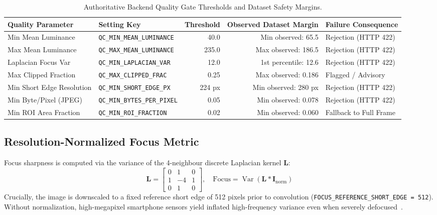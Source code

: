 \documentclass[11pt,a4paper]{report}
\begin{document}
\begin{table}[H]
\centering
\small
\begin{tabularx}{\textwidth}{llrrX}
\toprule
\textbf{Quality Parameter} & \textbf{Setting Key} & \textbf{Threshold} & \textbf{Observed Dataset Margin} & \textbf{Failure Consequence} \\
\midrule
Min Mean Luminance & \texttt{QC\_MIN\_MEAN\_LUMINANCE} & 40.0 & Min observed: 65.5 & Rejection (HTTP 422) \\
Max Mean Luminance & \texttt{QC\_MAX\_MEAN\_LUMINANCE} & 235.0 & Max observed: 186.5 & Rejection (HTTP 422) \\
Laplacian Focus Var & \texttt{QC\_MIN\_LAPLACIAN\_VAR} & 12.0 & 1st percentile: 12.6 & Rejection (HTTP 422) \\
Max Clipped Fraction & \texttt{QC\_MAX\_CLIPPED\_FRAC} & 0.25 & Max observed: 0.186 & Flagged / Advisory \\
Min Short Edge Resolution & \texttt{QC\_MIN\_SHORT\_EDGE\_PX} & 224 px & Min observed: 280 px & Rejection (HTTP 422) \\
Min Byte/Pixel (JPEG) & \texttt{QC\_MIN\_BYTES\_PER\_PIXEL}& 0.05 & Min observed: 0.078 & Rejection (HTTP 422) \\
Min ROI Area Fraction & \texttt{QC\_MIN\_ROI\_FRACTION} & 0.02 & Min observed: 0.060 & Fallback to Full Frame \\
\bottomrule
\end{tabularx}
\caption{Authoritative Backend Quality Gate Thresholds and Dataset Safety Margins.}
\label{tab:qc_thresholds}
\end{table}

\subsection{Resolution-Normalized Focus Metric}
Focus sharpness is computed via the variance of the 4-neighbour discrete Laplacian kernel $\mathbf{L}$:
\begin{equation}
  \mathbf{L} = \begin{bmatrix} 0 & 1 & 0 \\ 1 & -4 & 1 \\ 0 & 1 & 0 \end{bmatrix}, \quad \text{Focus} = \operatorname{Var}\left( \mathbf{L} * \mathbf{I}_\text{norm} \right)
\end{equation}
Crucially, the image is downscaled to a fixed reference short edge of 512 pixels prior to convolution (\texttt{FOCUS\_REFERENCE\_SHORT\_EDGE = 512}). Without normalization, high-megapixel smartphone sensors yield inflated high-frequency variance even when severely defocused~\cite{pechpacheco2000diatom}.
\end{document}
